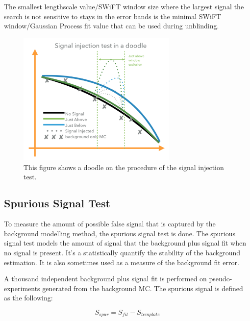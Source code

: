    The smallest lengthscale value/SWiFT window size where the largest signal the search is not sensitive to stays in the error bands is the minimal SWiFT window/Gaussian Process fit value that can be used during unblinding. 

\begin{figure}[!htb]
    \begin{center}
        \includegraphics[width=0.7\textwidth]{figures/chapter_analysismethod/SignalInjectionTest}
        \caption{
            This figure shows a doodle on the procedure of the signal injection test.
        }
        \label{signalinjection}
    \end{center}
\end{figure}
\FloatBarrier

    \subsection{Spurious Signal Test} 
    \label{spurious}
    To measure the amount of possible false signal that is captured by the background modelling method, the spurious signal test is done. The spurious signal test models the amount of signal that the background plus signal fit when no signal is present.  It's a statistically quantify the stability of the background estimation. It is also sometimes used as a measure of the background fit error.

    A thousand independent background plus signal fit is performed on pseudo-experiments generated from the background MC. The spurious signal is defined as the following:
    
    \begin{equation}
        S_{spur} = S_{fit} - S_{template}
    \end{equation}

